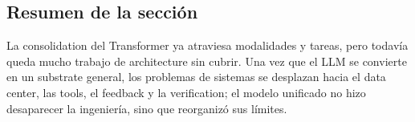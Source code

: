 \subsection{Resumen de la sección}

La consolidation del Transformer ya atraviesa modalidades y tareas, pero todavía queda mucho trabajo de architecture sin cubrir. Una vez que el LLM se convierte en un substrate general, los problemas de sistemas se desplazan hacia el data center, las tools, el feedback y la verification; el modelo unificado no hizo desaparecer la ingeniería, sino que reorganizó sus límites.
